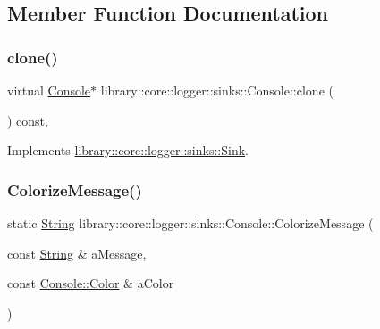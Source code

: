 \subsection{Member Function Documentation}
\mbox{\label{classlibrary_1_1core_1_1logger_1_1sinks_1_1Console_ac5c80193b0832f760a7447e7abc7d468}} 
\subsubsection{\texorpdfstring{clone()}{clone()}}
{\footnotesize\ttfamily virtual \hyperlink{classlibrary_1_1core_1_1logger_1_1sinks_1_1Console}{Console}$\ast$ library\+::core\+::logger\+::sinks\+::\+Console\+::clone (\begin{DoxyParamCaption}{ }\end{DoxyParamCaption}) const\hspace{0.3cm}{\ttfamily [override]}, {\ttfamily [virtual]}}



Implements \hyperlink{classlibrary_1_1core_1_1logger_1_1sinks_1_1Sink_a00ba941947d903825f4922694e0961dd}{library\+::core\+::logger\+::sinks\+::\+Sink}.

\mbox{\label{classlibrary_1_1core_1_1logger_1_1sinks_1_1Console_a9cf21ce963c2079b613bfb5788bb5659}} 
\subsubsection{\texorpdfstring{Colorize\+Message()}{ColorizeMessage()}}
{\footnotesize\ttfamily static \hyperlink{classlibrary_1_1core_1_1types_1_1String}{String} library\+::core\+::logger\+::sinks\+::\+Console\+::\+Colorize\+Message (\begin{DoxyParamCaption}\item[{const \hyperlink{classlibrary_1_1core_1_1types_1_1String}{String} \&}]{a\+Message,  }\item[{const \hyperlink{classlibrary_1_1core_1_1logger_1_1sinks_1_1Console_aa7a07d8165e1df74ad4d289d5220bc96}{Console\+::\+Color} \&}]{a\+Color }\end{DoxyParamCaption})\hspace{0.3cm}{\ttfamily [static]}}

